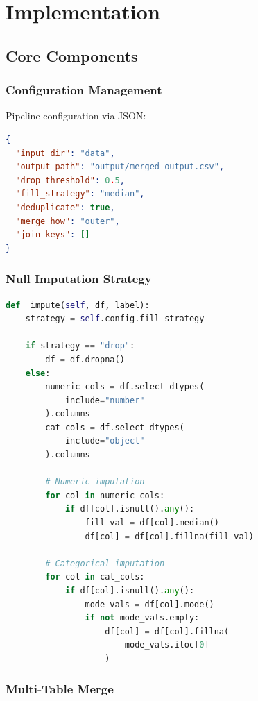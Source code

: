 \documentclass[12pt,a4paper]{report}
\begin{document}
\chapter{Implementation}

\section{Core Components}

\subsection{Configuration Management}

Pipeline configuration via JSON:

\begin{lstlisting}[language=json]
{
  "input_dir": "data",
  "output_path": "output/merged_output.csv",
  "drop_threshold": 0.5,
  "fill_strategy": "median",
  "deduplicate": true,
  "merge_how": "outer",
  "join_keys": []
}
\end{lstlisting}

\subsection{Null Imputation Strategy}

\begin{lstlisting}[language=Python]
def _impute(self, df, label):
    strategy = self.config.fill_strategy
    
    if strategy == "drop":
        df = df.dropna()
    else:
        numeric_cols = df.select_dtypes(
            include="number"
        ).columns
        cat_cols = df.select_dtypes(
            include="object"
        ).columns
        
        # Numeric imputation
        for col in numeric_cols:
            if df[col].isnull().any():
                fill_val = df[col].median()
                df[col] = df[col].fillna(fill_val)
        
        # Categorical imputation
        for col in cat_cols:
            if df[col].isnull().any():
                mode_vals = df[col].mode()
                if not mode_vals.empty:
                    df[col] = df[col].fillna(
                        mode_vals.iloc[0]
                    )
\end{lstlisting}

\subsection{Multi-Table Merge}
\end{document}
